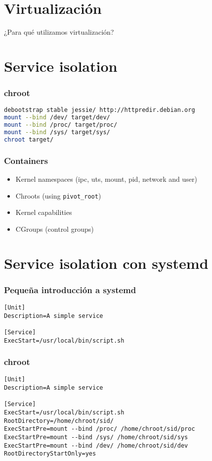 \section{Virtualización}
\begin{frame}
  \vfill
  ¿Para qué utilizamos virtualización?
  \vfill
\end{frame}

\section{Service isolation}
\begin{frame}[fragile]
  \frametitle{chroot}

\begin{lstlisting}[language=sh]
debootstrap stable jessie/ http://httpredir.debian.org
mount --bind /dev/ target/dev/
mount --bind /proc/ target/proc/
mount --bind /sys/ target/sys/
chroot target/
\end{lstlisting}

\end{frame}

\begin{frame}
  \frametitle{Containers}
  \begin{itemize}
    
  \item     Kernel namespaces (ipc, uts, mount, pid, network and user)
  \item     Chroots (using \texttt{pivot\_root})
  \item     Kernel capabilities
  \item     CGroups (control groups)

  \end{itemize}
\end{frame}

\section{Service isolation con systemd}
\begin{frame}[fragile]
  \frametitle{Pequeña introducción a systemd}

  \begin{lstlisting}
[Unit]
Description=A simple service

[Service]
ExecStart=/usr/local/bin/script.sh
\end{lstlisting}

\end{frame}

\begin{frame}[fragile]
  \frametitle{chroot}
\begin{lstlisting}
[Unit]
Description=A simple service

[Service]
ExecStart=/usr/local/bin/script.sh
RootDirectory=/home/chroot/sid/
ExecStartPre=mount --bind /proc/ /home/chroot/sid/proc
ExecStartPre=mount --bind /sys/ /home/chroot/sid/sys
ExecStartPre=mount --bind /dev/ /home/chroot/sid/dev
RootDirectoryStartOnly=yes
\end{lstlisting}
\end{frame}


